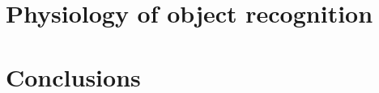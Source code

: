 \documentclass[a4]{epirob}
\begin{document}
\section{Physiology of object recognition}




\section{Conclusions}





%




\nocite{natale05developmental}
\nocite{arsenio05exploiting}
\fi







\end{document}
